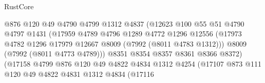 \begin{lexlean}{RustCore}
\begin{coremodule}
                                      @876
                                      @120
                                      @49
                                      @4790
                                      @4799
                                      @1312
                                      @4837
                                      (@12623
                                        @100
                                        @55
                                        @51
                                        @4790
                                        @4797
                                        @1431
                                        (@17959
                                          @4789
                                          @4796
                                          @1289
                                          @4772
                                          @1296
                                          @12556
                                          (@17973
                                            @4782
                                            @1296
                                            @17979
                                            @12667
                                            @8009
                                            (@7992 (@8011 @4783 @1312)))
                                          @8009
                                          (@7992 (@8011 @4773 @4789)))
                                        @8351
                                        @8354
                                        @8357
                                        @8361
                                        @8366
                                        @8372)
                                      (@17158
                                        @4799
                                        @876
                                        @120
                                        @49
                                        @4822
                                        @4834
                                        @1312
                                        @4254
                                        (@17107
                                          @873
                                          @111
                                          @120
                                          @49
                                          @4822
                                          @4831
                                          @1312
                                          @4834
                                          (@17116

\end{coremodule}
\end{lexlean}
